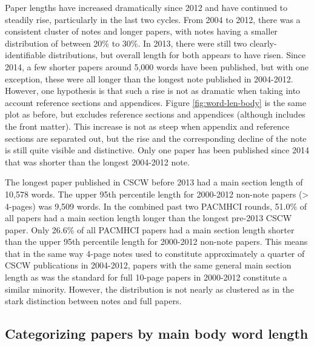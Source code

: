\documentclass[format=acmsmall, screen=true]{acmart}
\begin{document}
Paper lengths have increased dramatically since 2012 and have continued to steadily rise, particularly in the last two cycles. From 2004 to 2012, there was a consistent cluster of notes and longer papers, with notes having a smaller distribution of between 20\% to 30\%. In 2013, there were still two clearly-identifiable distributions, but overall length for both appears to have risen. Since 2014, a few shorter papers around 5,000 words have been published, but with one exception, these were all longer than the longest note published in 2004-2012. However, one hypothesis is that such a rise is not as dramatic when taking into account reference sections and appendices. Figure \ref{fig:word-len-body} is the same plot as before, but excludes reference sections and appendices (although includes the front matter). This increase is not as steep when appendix and reference sections are separated out, but the rise and the corresponding decline of the note is still quite visible and distinctive. Only one paper has been published since 2014 that was shorter than the longest 2004-2012 note. 

The longest paper published in CSCW before 2013 had a main section length of 10,578 words. The upper 95th percentile length for 2000-2012 non-note papers (> 4-pages) was 9,509 words. In the combined past two PACMHCI rounds, 51.0\% of all papers had a main section length longer than the longest pre-2013 CSCW paper. Only 26.6\% of all PACMHCI papers had a main section length shorter than the upper 95th percentile length for 2000-2012 non-note papers. This means that in the same way 4-page notes used to constitute approximately a quarter of CSCW publications in 2004-2012, papers with the same general main section length as was the standard for full 10-page papers in 2000-2012 constitute a similar minority. However, the distribution is not nearly as clustered as in the stark distinction between notes and full papers.

\subsection{Categorizing papers by main body word length}
\end{document}
